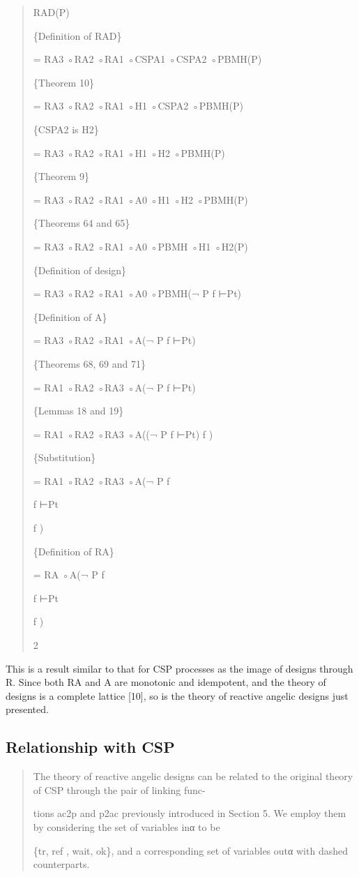 \documentclass[11pt]{article}
\begin{document}
\begin{quote}\small\raggedright
RAD(P)
\par
\{Definition of RAD\}
\par
= RA3 ◦RA2 ◦RA1 ◦CSPA1 ◦CSPA2 ◦PBMH(P)
\par
\{Theorem 10\}
\par
= RA3 ◦RA2 ◦RA1 ◦H1 ◦CSPA2 ◦PBMH(P)
\par
\{CSPA2 is H2\}
\par
= RA3 ◦RA2 ◦RA1 ◦H1 ◦H2 ◦PBMH(P)
\par
\{Theorem 9\}
\par
= RA3 ◦RA2 ◦RA1 ◦A0 ◦H1 ◦H2 ◦PBMH(P)
\par
\{Theorems 64 and 65\}
\par
= RA3 ◦RA2 ◦RA1 ◦A0 ◦PBMH ◦H1 ◦H2(P)
\par
\{Definition of design\}
\par
= RA3 ◦RA2 ◦RA1 ◦A0 ◦PBMH(¬ P f ⊢Pt)
\par
\{Definition of A\}
\par
= RA3 ◦RA2 ◦RA1 ◦A(¬ P f ⊢Pt)
\par
\{Theorems 68, 69 and 71\}
\par
= RA1 ◦RA2 ◦RA3 ◦A(¬ P f ⊢Pt)
\par
\{Lemmas 18 and 19\}
\par
= RA1 ◦RA2 ◦RA3 ◦A((¬ P f ⊢Pt) f )
\par
\{Substitution\}
\par
= RA1 ◦RA2 ◦RA3 ◦A(¬ P f
\par
f ⊢Pt
\par
f )
\par
\{Definition of RA\}
\par
= RA ◦A(¬ P f
\par
f ⊢Pt
\par
f )
\par
2
\end{quote}

This is a result similar to that for CSP processes as the image of designs through R. Since both RA and A are monotonic and idempotent, and the theory of designs is a complete lattice [10], so is the theory of reactive angelic designs just presented.

\subsection{Relationship with CSP}
\begin{quote}\small\raggedright
The theory of reactive angelic designs can be related to the original theory of CSP through the pair of linking func-
\par
tions ac2p and p2ac previously introduced in Section 5. We employ them by considering the set of variables inα to be
\par
\{tr, ref , wait, ok\}, and a corresponding set of variables outα with dashed counterparts.
\end{quote}
\end{document}
